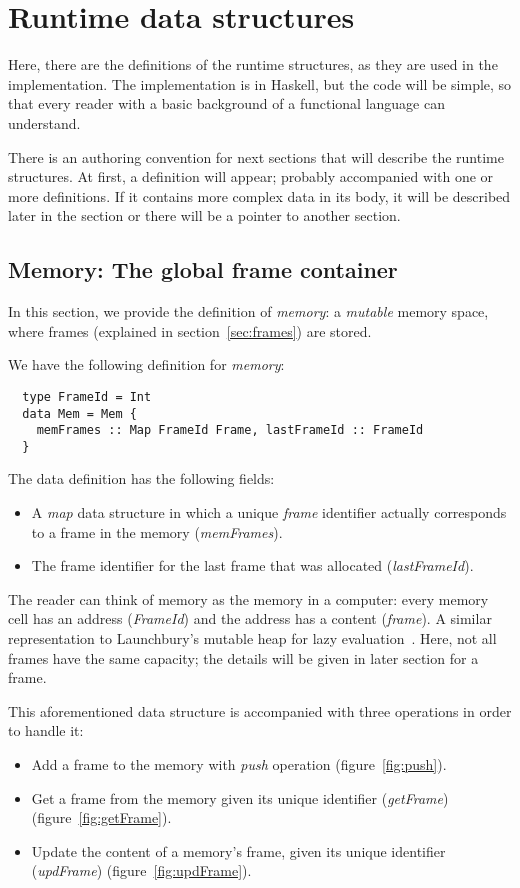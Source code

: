 \documentclass[diploma]{softlab-thesis}
\begin{document}
\section{Runtime data structures}
\label{sec:runtime-structs}
Here, there are the definitions of the runtime structures, as they are used in the implementation. The 
implementation is in Haskell, but the code will be simple, so that every reader with a basic background of a functional 
language can understand.
\newline
\par There is an authoring convention for next sections that will describe the runtime structures. At first, a definition 
will appear; probably accompanied with one or more definitions. If it contains more complex data in its body, it will be 
described later in the section or there will be a pointer to another section.

\subsection{Memory: The global frame container}

In this section, we provide the definition of \textit{memory}: 
a \textit{mutable} memory space, where frames (explained in section~\ref{sec:frames}) are stored.

We have the following definition for \textit{memory}:
\begin{verbatim}
  type FrameId = Int
  data Mem = Mem {
    memFrames :: Map FrameId Frame, lastFrameId :: FrameId
  }
\end{verbatim}

The data definition has the following fields:
\begin{itemize}
  \item A \textit{map} data structure in which a unique \textit{frame} identifier actually corresponds to 
  a frame in the memory (\textit{memFrames}). 
  \item The frame identifier for the last frame that was allocated (\textit{lastFrameId}).
\end{itemize}

The reader can think of memory as the memory in a computer: every memory cell has an address (\textit{FrameId}) and 
the address has a content (\textit{frame}). A similar representation to Launchbury's mutable heap for 
lazy evaluation~\cite{La93}.
Here, not all frames have the same capacity; the details will be given in later section for a frame.
\newline
\par This aforementioned data structure is accompanied with three operations in order to handle it:
\begin{itemize}
  \item Add a frame to the memory with \textit{push} operation (figure~\ref{fig:push}).
  \item Get a frame from the memory given its unique identifier (\textit{getFrame})
  (figure~\ref{fig:getFrame}).
  \item Update the content of a memory's frame, given its unique identifier (\textit{updFrame})
  (figure~\ref{fig:updFrame}).
\end{itemize}
\end{document}
